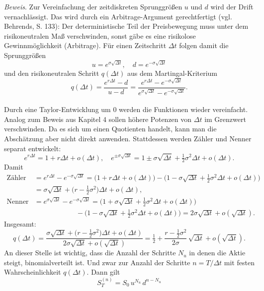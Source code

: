 \begin{satz}
\textit{Beweis}. Zur Vereinfachung der zeitdiskreten Sprunggrößen $u$ und $d$ wird der Drift vernachlässigt.
Das wird durch ein Arbitrage-Argument gerechtfertigt (vgl. Behrends\cite{behrends}, S. 133):
Der deterministische Teil der Preisbewegung muss unter dem risikoneutralen Maß verschwinden, 
sonst gäbe es eine risikolose Gewinnmöglichkeit (Arbitrage). 
Für einen Zeitschritt $\Delta t$ folgen damit die Sprunggrößen
$$
u = e^{\sigma \sqrt{\Delta t}},\quad d = e^{-\sigma \sqrt{\Delta t}}
$$
und den risikoneutralen Schritt $q(\Delta t)$ aus dem Martingal-Kriterium
$$
q(\Delta t) = \frac{e^{r \Delta t} - d}{u - d}
= \frac{e^{r \Delta t} - e^{-\sigma \sqrt{\Delta t}}}{e^{\sigma \sqrt{\Delta t}} - e^{-\sigma \sqrt{\Delta t}}}.
$$
\\ Durch eine Taylor-Entwicklung um $0$ werden die Funktionen wieder vereinfacht. Analog zum Beweis aus Kapitel 4
sollen höhere Potenzen von $\Delta t$ im Grenzwert verschwinden. Da es sich um einen Quotienten handelt,
kann man die Abschätzung aber nicht direkt anwenden. Stattdessen werden Zähler und Nenner separat entwickelt:
$$
e^{r\Delta t} = 1 + r\Delta t + o(\Delta t),\quad
e^{\pm \sigma\sqrt{\Delta t}} = 1 \pm \sigma \sqrt{\Delta t} + \tfrac12 \sigma^2 \Delta t + o(\Delta t).
$$
Damit
$$
\begin{aligned}
\text{Zähler} &= e^{r \Delta t} - e^{-\sigma \sqrt{\Delta t}}
= \big(1 + r\Delta t + o(\Delta t)\big) - \big(1 - \sigma \sqrt{\Delta t} + \tfrac12 \sigma^2 \Delta t + o(\Delta t)\big) \\
&= \sigma \sqrt{\Delta t} + \big(r - \tfrac12 \sigma^2\big)\Delta t + o(\Delta t), \\
\text{Nenner} &= e^{\sigma \sqrt{\Delta t}} - e^{-\sigma \sqrt{\Delta t}}
= \big(1 + \sigma \sqrt{\Delta t} + \tfrac12 \sigma^2 \Delta t + o(\Delta t)\big) \\
&\qquad\qquad\qquad - \big(1 - \sigma \sqrt{\Delta t} + \tfrac12 \sigma^2 \Delta t + o(\Delta t)\big)
= 2\sigma \sqrt{\Delta t} + o(\sqrt{\Delta t}).
\end{aligned}
$$
Insgesamt:
$$
q(\Delta t) = \frac{\sigma \sqrt{\Delta t} + \big(r - \tfrac12 \sigma^2\big)\Delta t + o(\Delta t)}{2\sigma \sqrt{\Delta t} + o(\sqrt{\Delta t})}
= \tfrac12 + \frac{r - \tfrac12 \sigma^2}{2\sigma}\,\sqrt{\Delta t} + o(\sqrt{\Delta t}).
$$
An dieser Stelle ist wichtig, dass die Anzahl der Schritte $N_u$ in denen die Aktie steigt, binomialverteilt ist.
Und zwar zur Anzahl der Schritte $n=T/\Delta t$ mit festen Wahrscheinlichkeit $q(\Delta t)$.
Dann gilt
$$
S_T^{(n)} = S_0\, u^{N_u}\, d^{n-N_u}
$$
\end{satz}
